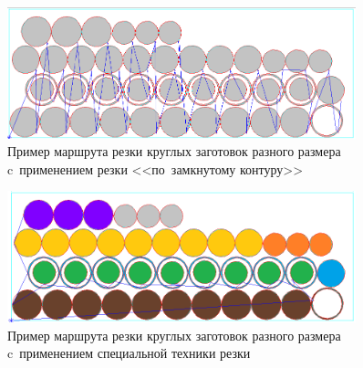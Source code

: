 \documentclass[11pt,twoside,openany]{report}
\begin{document}
\begin{figure}
  \begin{center}
  \includegraphics[width=0.9\textwidth]{circles-c.png}
  \caption{
    Пример маршрута резки круглых заготовок разного размера
    c~применением резки
    <<по~замкнутому контуру>>
    }
  \label{circles-c}
  \end{center}
\end{figure}

\begin{figure}
  \begin{center}
  \includegraphics[width=0.9\textwidth]{circles-d.png}
  \caption{
    Пример маршрута резки круглых заготовок разного размера
    c~применением специальной техники резки
    }
  \label{circles-d}
  \end{center}
\end{figure}
\end{document}
